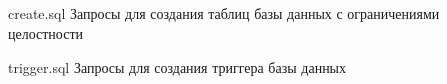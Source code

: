 \begin{appendices}
	\chapter{}
	{create.sql}
	{Запросы для создания таблиц базы данных с ограничениями целостности}

	{trigger.sql}
	{Запросы для создания триггера базы данных}
\end{appendices}
